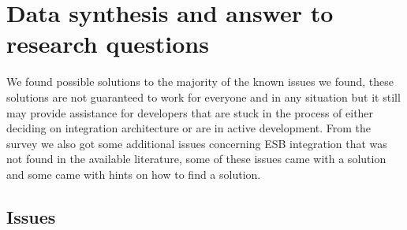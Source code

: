 \documentclass{llncs}
\begin{document}
\section{Data synthesis and answer to research questions}
We found possible solutions to the majority of the known issues we found, these solutions are not guaranteed to work for everyone and in any situation but it still may provide assistance for developers that are stuck in the process of either deciding on integration architecture or are in active development.
From the survey we also got some additional issues concerning ESB integration that was not found in the available literature, some of these issues came with a solution and some came with hints on how to find a solution.

\subsection{Issues}
\end{document}
